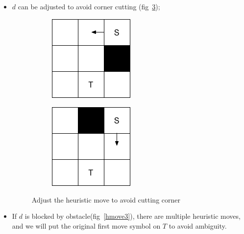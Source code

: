 \begin{itemize}
  \item $d$ can be adjusted to avoid corner cutting (fig~\ref{hmove2});

    \begin{figure}[h]
      \centering
      \begin{subfigure}{.35\columnwidth}
      \centering
        \includegraphics[width=.6\columnwidth]{./hmove2.png}
        \caption{}
        \label{hmove2_1}
      \end{subfigure}%
      \begin{subfigure}{.35\columnwidth}
      \centering
        \includegraphics[width=.6\columnwidth]{./hmove2_2.png}
        \caption{}
        \label{hmove2_2}
      \end{subfigure}
      \caption{\small Adjust the heuristic move to avoid cutting corner}
      \label{hmove2}
    \end{figure}

  \item If $d$ is blocked by obstacle(fig~\ref{hmove3}), there are multiple heuristic moves, 
    and we will put the original first move symbol on $T$ to avoid ambiguity.


\end{itemize}
